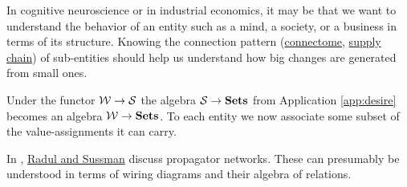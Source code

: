 \begin{application}

In cognitive neuroscience or in industrial economics, it may be that we want to understand the behavior of an entity such as a mind, a society, or a business in terms of its structure. Knowing the connection pattern (\href{http://en.wikipedia.org/wiki/Connectome}{connectome}, \href{http://en.wikipedia.org/wiki/Supply_chain}{supply chain}) of sub-entities should help us understand how big changes are generated from small ones.

Under the functor $\mathcal{W}\rightarrow\mathcal{S}$ the algebra $\mathcal{S}\rightarrow{\bf Sets}$ from Application \ref{app:desire} becomes an algebra $\mathcal{W}\rightarrow{\bf Sets}$. To each entity we now associate some subset of the value-assignments it can carry. 
\end{application}

\begin{application}

In \cite{RS}, \href{http://dspace.mit.edu/bitstream/handle/1721.1/44215/MIT-CSAIL-TR-2009-002.pdf?sequence=1}{Radul and Sussman} discuss propagator networks. These can presumably be understood in terms of wiring diagrams and their algebra of relations.

\end{application}
 

